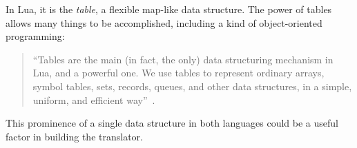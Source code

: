 In Lua, it is the \emph{table}, a flexible map-like data structure. The power of
tables allows many things to be accomplished, including a kind of
object-oriented programming: 
\begin{quotation}
``Tables are the main (in fact, the only) data structuring mechanism in Lua, and
a powerful one. We use tables to represent ordinary arrays, symbol tables, sets,
records, queues, and other data structures, in a simple, uniform, and efficient
way''~\cite[p.14]{luabook}.
\end{quotation}

This prominence of a single data structure in both languages could be a useful
factor in building the translator.
